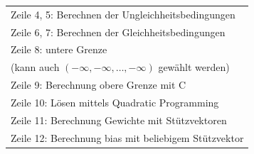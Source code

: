 \documentclass[a4paper,11pt,twoside]{scrreprt}
\begin{document}
\begin{table}[H]
\begin{tabular}{|l|}
    Zeile 4, 5: Berechnen der Ungleichheitsbedingungen\\
    Zeile 6, 7: Berechnen der Gleichheitsbedingungen\\
    Zeile 8: untere Grenze \\
    (kann auch $\left( -\infty, -\infty, \ldots, -\infty \right)$ gewählt werden) \\
    Zeile 9: Berechnung obere Grenze mit C \\
    Zeile 10: Lösen mittels Quadratic Programming \\
    Zeile 11: Berechnung Gewichte mit Stützvektoren \\
    Zeile 12: Berechnung bias mit beliebigem Stützvektor \\
    \hline
\end{tabular}
\end{table}
\end{document}
